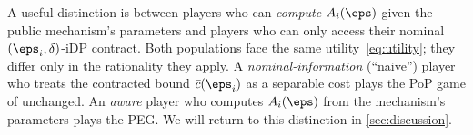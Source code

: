 \begin{remark}
\label{rem:awareness}
A useful distinction is between players who can \emph{compute}
$A_i(\boldsymbol{\eps})$ given the public mechanism's parameters and players
who can only access their nominal $(\eps_i,\delta)$-iDP contract. Both
populations face the same utility~\eqref{eq:utility}; they differ only in
the rationality they apply. A \emph{nominal-information} (``naive'') player
who treats the contracted bound $\bar c(\eps_i)$ as a separable cost plays
the PoP game of \citet{pejo2019together} unchanged. An
\emph{aware} player who computes $A_i(\boldsymbol{\eps})$ from the
mechanism's parameters plays the PEG. We will return to this distinction in
\cref{sec:discussion}.
\end{remark}
